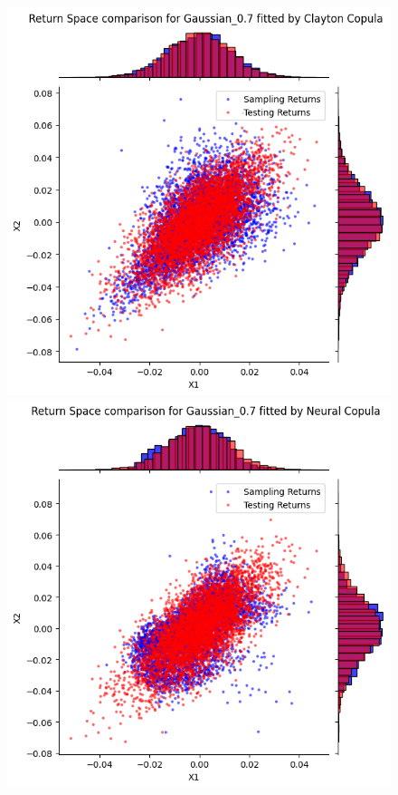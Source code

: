 \documentclass[%
a4paper,							
11pt,								
bibliography=totoc,						
abstracton=true					
]
{scrartcl}
\theoremstyle{plain}
\theoremstyle{definition}
\theoremstyle{remark}
\newcommand{\1}{\mathbbm{1}}
\begin{document}
\begin{figure}[H]
\begin{minipage}{0.4\textwidth}
    \end{minipage}
    \vfill
    \begin{minipage}{0.4\textwidth}
        \centering
        \includegraphics[width=\textwidth]{5ResultsDiscussion/pictures/PortfolioTest/ResultPortfolio2Clayton.png}
    \end{minipage}
    \hfill
    \begin{minipage}{0.4\textwidth}
        \centering
        \includegraphics[width=\textwidth]{5ResultsDiscussion/pictures/PortfolioTest/ResultPortfolio2Neural.png}

\end{minipage}
\end{figure}
\end{document}
